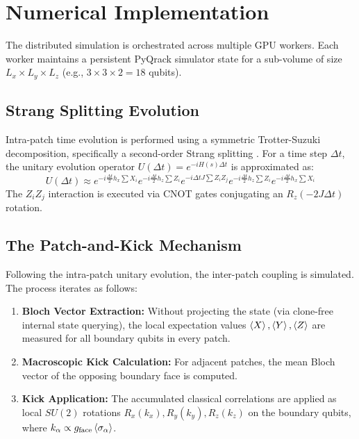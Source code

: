 \documentclass[11pt,a4paper]{article}
\begin{document}
\section{Numerical Implementation}

The distributed simulation is orchestrated across multiple GPU workers. Each worker maintains a persistent PyQrack simulator state for a sub-volume of size $L_x \times L_y \times L_z$ (e.g., $3 \times 3 \times 2 = 18$ qubits).

\subsection{Strang Splitting Evolution}
Intra-patch time evolution is performed using a symmetric Trotter-Suzuki decomposition, specifically a second-order Strang splitting \cite{suzuki1990fractal}. For a time step $\Delta t$, the unitary evolution operator $U(\Delta t) = e^{-i H(s) \Delta t}$ is approximated as:
\begin{equation}
    U(\Delta t) \approx e^{-i \frac{\Delta t}{2} h_x \sum X_i} e^{-i \frac{\Delta t}{2} h_z \sum Z_i} e^{-i \Delta t J \sum Z_i Z_j} e^{-i \frac{\Delta t}{2} h_z \sum Z_i} e^{-i \frac{\Delta t}{2} h_x \sum X_i}
\end{equation}
The $Z_i Z_j$ interaction is executed via CNOT gates conjugating an $R_z(-2 J \Delta t)$ rotation.

\subsection{The Patch-and-Kick Mechanism}
Following the intra-patch unitary evolution, the inter-patch coupling is simulated. The process iterates as follows:
\begin{enumerate}
    \item \textbf{Bloch Vector Extraction:} Without projecting the state (via clone-free internal state querying), the local expectation values $\ev{X}, \ev{Y}, \ev{Z}$ are measured for all boundary qubits in every patch.
    \item \textbf{Macroscopic Kick Calculation:} For adjacent patches, the mean Bloch vector of the opposing boundary face is computed.
    \item \textbf{Kick Application:} The accumulated classical correlations are applied as local $SU(2)$ rotations $R_x(k_x), R_y(k_y), R_z(k_z)$ on the boundary qubits, where $k_\alpha \propto g_{\text{face}} \ev{\sigma_\alpha}$.
\end{enumerate}
\end{document}
